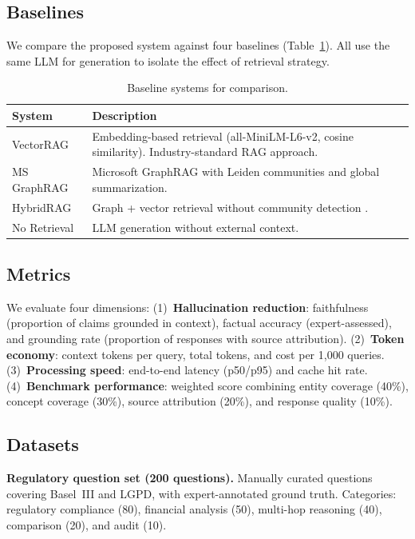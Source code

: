 \documentclass[review]{elsarticle}
\begin{document}
\subsection{Baselines}

We compare the proposed system against four baselines (Table~\ref{tab:baselines}). All use the same LLM for generation to isolate the effect of retrieval strategy.

\begin{table}[t]
\caption{Baseline systems for comparison.}
\label{tab:baselines}
\centering
\small
\begin{tabular}{@{}lp{7cm}@{}}
\toprule
\textbf{System} & \textbf{Description} \\
\midrule
VectorRAG & Embedding-based retrieval (all-MiniLM-L6-v2, cosine similarity). Industry-standard RAG approach. \\
MS GraphRAG & Microsoft GraphRAG \citep{edge2024graphrag} with Leiden communities and global summarization. \\
HybridRAG & Graph + vector retrieval without community detection \citep{sarmah2024hybridrag}. \\
No Retrieval & LLM generation without external context. \\
\bottomrule
\end{tabular}
\end{table}

\subsection{Metrics}

We evaluate four dimensions: (1)~\textbf{Hallucination reduction}: faithfulness (proportion of claims grounded in context), factual accuracy (expert-assessed), and grounding rate (proportion of responses with source attribution). (2)~\textbf{Token economy}: context tokens per query, total tokens, and cost per 1,000 queries. (3)~\textbf{Processing speed}: end-to-end latency (p50/p95) and cache hit rate. (4)~\textbf{Benchmark performance}: weighted score combining entity coverage (40\%), concept coverage (30\%), source attribution (20\%), and response quality (10\%).

\subsection{Datasets}

\textbf{Regulatory question set (200 questions).} Manually curated questions covering Basel~III and LGPD, with expert-annotated ground truth. Categories: regulatory compliance (80), financial analysis (50), multi-hop reasoning (40), comparison (20), and audit (10).
\end{document}
